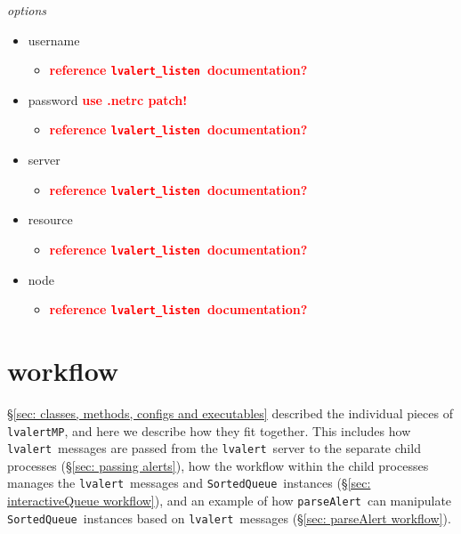 \documentclass{article}
\newcommand{\FIXME}[1]{\textcolor{red}{\textbf{#1}}}
\newcommand{\alert}{\texttt{lvalert}}
\newcommand{\lvalertListen}{\texttt{lvalert\_listen}}
\newcommand{\lvalertMP}{\texttt{lvalertMP}}
\newcommand{\parseAlert}{\texttt{parseAlert}}
\newcommand{\SortedQueue}{\texttt{SortedQueue}}
\begin{document}
\noindent
\textit{options}

\begin{itemize}
    \item{username
        \begin{itemize}
            \item{\FIXME{reference \lvalertListen~documentation?}}
        \end{itemize}
         }
    \item{password \FIXME{use .netrc patch!}
        \begin{itemize}
            \item{\FIXME{reference \lvalertListen~documentation?}}
        \end{itemize}
         }
    \item{server
        \begin{itemize}
            \item{\FIXME{reference \lvalertListen~documentation?}}
        \end{itemize}
         }
    \item{resource
        \begin{itemize}
            \item{\FIXME{reference \lvalertListen~documentation?}}
        \end{itemize}
         }
    \item{node
        \begin{itemize}
            \item{\FIXME{reference \lvalertListen~documentation?}}
        \end{itemize}
         }
\end{itemize}


\section{workflow}
\label{sec: workflow}

\S\ref{sec: classes, methods, configs and executables} described the individual pieces of \lvalertMP, and here we describe how they fit together.
This includes how \alert~messages are passed from the \alert~server to the separate child processes (\S\ref{sec: passing alerts}), how the workflow within the child processes manages the \alert~messages and \SortedQueue~instances (\S\ref{sec: interactiveQueue workflow}), and an example of how \parseAlert~can manipulate \SortedQueue~instances based on \alert~messages (\S\ref{sec: parseAlert workflow}).
\end{document}
